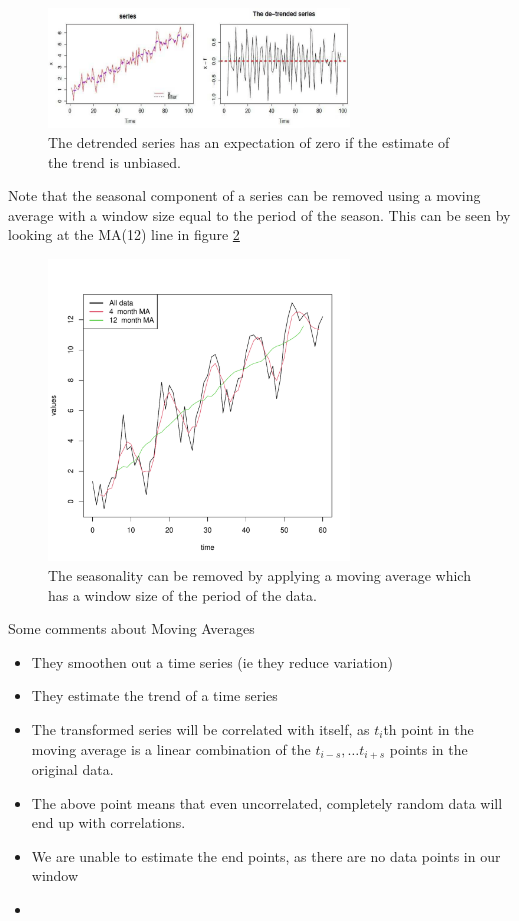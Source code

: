\documentclass[12pt]{article}
\begin{document}
        \begin{figure}[t]
            \centering
            \includegraphics[width=8cm]{detrended_series}
            \caption{The detrended series has an expectation of zero if the estimate of
            the trend is unbiased.}
            \label{fig:detrended_series}
        \end{figure}

        Note that the seasonal component of a series can be removed using a moving
        average with a window size equal to the period of the season. This can be 
        seen by looking at the MA(12) line in figure \ref{fig:removing_the_seasons}


        \begin{figure}[t]
            \centering
            \includegraphics[width=8cm]{removing_the_seasons}
            \caption{The seasonality can be removed by applying a moving average
            which has a window size of the period of the data.}
            \label{fig:removing_the_seasons}
        \end{figure}


        Some comments about Moving Averages
        \begin{itemize} 
            \item They smoothen out a time series (ie they reduce variation)
            \item They estimate the trend of a time series
            \item The transformed series will be correlated with itself, as $t_i$th
                point in the moving average is a linear combination of the 
                $t_{i-s}, \dots t_{i+s}$ points in the original data.
            \item The above point means that even uncorrelated, completely random data
                will end up with correlations.
            \item We are unable to estimate the end points, as there are no data points
                in our window
            \item 
        \end{itemize} 
\end{document}
